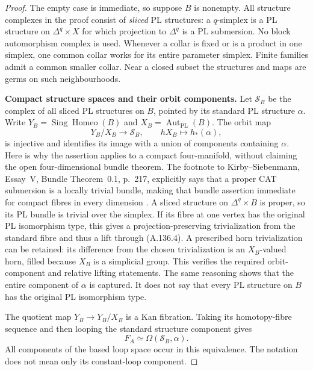 \begin{proof}
The empty case is immediate, so suppose $B$ is nonempty. All structure
complexes in the proof consist of \emph{sliced} PL structures: a
$q$-simplex is a PL structure on $\Delta^q\times X$ for which projection
to $\Delta^q$ is a PL submersion. No block automorphism complex is used.
Whenever a collar is fixed or is a product in one simplex, one common
collar works for its entire parameter simplex. Finite families admit a
common smaller collar. Near a closed subset the structures and maps
are germs on such neighbourhoods.

\textbf{Compact structure spaces and their orbit components.}
Let $\mathcal S_B$ be the complex of all sliced PL structures on $B$,
pointed by its standard PL structure $\alpha$. Write
$Y_B=\operatorname{Sing}\operatorname{Homeo}(B)$ and
$X_B=\operatorname{Aut}_{\mathrm{PL}}(B)$. The orbit map
\[
 Y_B/X_B\longrightarrow\mathcal S_B,
 \qquad hX_B\longmapsto h_*(\alpha),                     \tag{A.136.4}
\]
is injective and identifies its image with a union of components
containing $\alpha$.
Here is why the assertion applies to a compact four-manifold, without
claiming the open four-dimensional bundle theorem. The footnote to
Kirby--Siebenmann, Essay~V, Bundle Theorem~0.1, p.~217, explicitly says
that a proper CAT submersion is a locally trivial bundle, making that
bundle assertion immediate for compact fibres in every dimension
\cite{KirbySiebenmann1977}. A sliced structure on $\Delta^q\times B$
is proper, so its PL bundle is trivial over the simplex. If its fibre
at one vertex has the original PL isomorphism type, this gives a
projection-preserving trivialization from the standard fibre and thus
a lift through (A.136.4). A prescribed horn trivialization can be
retained: its difference from the chosen trivialization is an
$X_B$-valued horn, filled because $X_B$ is a simplicial group.
This verifies the required orbit-component and relative lifting
statements. The same reasoning shows that the entire component of
$\alpha$ is captured. It does not say that every PL structure on $B$
has the original PL isomorphism type.

The quotient map $Y_B\to Y_B/X_B$ is a Kan fibration. Taking its
homotopy-fibre sequence and then looping the standard structure
component gives
\[
 F_A\simeq\Omega(\mathcal S_B,\alpha).                  \tag{A.136.5}
\]
All components of the based loop space occur in this equivalence.
The notation does not mean only its constant-loop component.


\end{proof}
